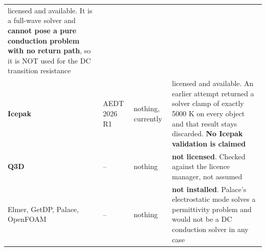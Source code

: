 \documentclass[10pt,]{article}
\begin{document}
\begin{longtable}[]{@{}llll@{}}
\begin{minipage}[t]{0.22\columnwidth}
licensed and available. It is a full-wave solver and \textbf{cannot pose
a pure conduction problem with no return path}, so it is NOT used for
the DC transition resistance\strut
\end{minipage}\tabularnewline
\begin{minipage}[t]{0.22\columnwidth}\raggedright
\textbf{Icepak}\strut
\end{minipage} & \begin{minipage}[t]{0.22\columnwidth}\raggedright
AEDT 2026 R1\strut
\end{minipage} & \begin{minipage}[t]{0.22\columnwidth}\raggedright
nothing, currently\strut
\end{minipage} & \begin{minipage}[t]{0.22\columnwidth}\raggedright
licensed and available. An earlier attempt returned a solver clamp of
exactly 5000 K on every object and that result stays discarded.
\textbf{No Icepak validation is claimed}\strut
\end{minipage}\tabularnewline
\begin{minipage}[t]{0.22\columnwidth}\raggedright
\textbf{Q3D}\strut
\end{minipage} & \begin{minipage}[t]{0.22\columnwidth}\raggedright
--\strut
\end{minipage} & \begin{minipage}[t]{0.22\columnwidth}\raggedright
nothing\strut
\end{minipage} & \begin{minipage}[t]{0.22\columnwidth}\raggedright
\textbf{not licensed}. Checked against the licence manager, not
assumed\strut
\end{minipage}\tabularnewline
\begin{minipage}[t]{0.22\columnwidth}\raggedright
Elmer, GetDP, Palace, OpenFOAM\strut
\end{minipage} & \begin{minipage}[t]{0.22\columnwidth}\raggedright
--\strut
\end{minipage} & \begin{minipage}[t]{0.22\columnwidth}\raggedright
nothing\strut
\end{minipage} & \begin{minipage}[t]{0.22\columnwidth}\raggedright
\textbf{not installed}. Palace's electrostatic mode solves a
permittivity problem and would not be a DC conduction solver in any
case\strut
\end{minipage}\tabularnewline
\bottomrule
\end{longtable}
\end{document}

